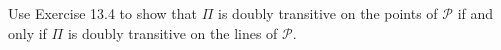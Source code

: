 Use Exercise 13.4 to show that $\Pi$ is doubly transitive on the points of $\mathcal{P}$ if and only if $\Pi$ is doubly transitive on the lines of $\mathcal{P}$.
